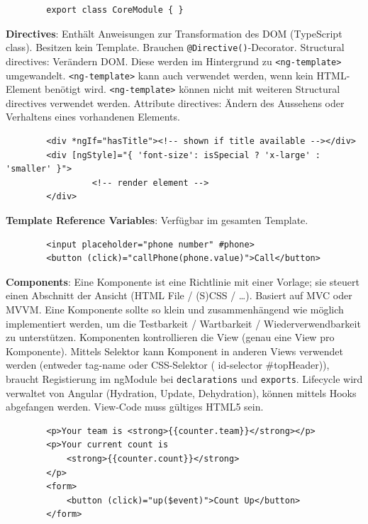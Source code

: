 \documentclass[10pt,landscape]{article}
\begin{document}
\begin{multicols}{3}
\begin{lstlisting}
        export class CoreModule { }
        \end{lstlisting}

        \textbf{Directives}: Enthält Anweisungen zur Transformation des DOM (TypeScript class).
        Besitzen kein Template.
        Brauchen \lstinline{@Directive()}-Decorator.
        Structural directives: Verändern DOM.
        Diese werden im Hintergrund zu \lstinline{<ng-template>} umgewandelt.
        \lstinline{<ng-template>} kann auch verwendet werden, wenn kein HTML-Element benötigt wird.
        \lstinline{<ng-template>} können nicht mit weiteren Structural directives verwendet werden.
        Attribute directives: Ändern des Aussehens oder Verhaltens eines vorhandenen Elements.

        \begin{lstlisting}
        <div *ngIf="hasTitle"><!-- shown if title available --></div>
        <div [ngStyle]="{ 'font-size': isSpecial ? 'x-large' : 'smaller' }">
                 <!-- render element -->
        </div>
        \end{lstlisting}

        \textbf{Template Reference Variables}: Verfügbar im gesamten Template.

        \begin{lstlisting}
        <input placeholder="phone number" #phone>
        <button (click)="callPhone(phone.value)">Call</button>
        \end{lstlisting}

        \textbf{Components}: Eine Komponente ist eine Richtlinie mit einer Vorlage; sie steuert einen Abschnitt der Ansicht (HTML File / (S)CSS / \ldots).
        Basiert auf MVC oder MVVM.
        Eine Komponente sollte so klein und zusammenhängend wie möglich implementiert werden, um die Testbarkeit / Wartbarkeit / Wiederverwendbarkeit zu unterstützen.
        Komponenten kontrollieren die View (genau eine View pro Komponente).
        Mittels Selektor kann Komponent in anderen Views verwendet werden (entweder tag-name oder CSS-Selektor ( id-selector #topHeader)), braucht Registierung im ngModule bei \lstinline{declarations} und \lstinline{exports}.
        Lifecycle wird verwaltet von Angular (Hydration, Update, Dehydration), können mittels Hooks abgefangen werden.
        View-Code muss gültiges HTML5 sein.

        \begin{lstlisting}
        <p>Your team is <strong>{{counter.team}}</strong></p>
        <p>Your current count is
            <strong>{{counter.count}}</strong>
        </p>
        <form>
            <button (click)="up($event)">Count Up</button>
        </form>


\end{lstlisting}
\end{multicols}
\end{document}
